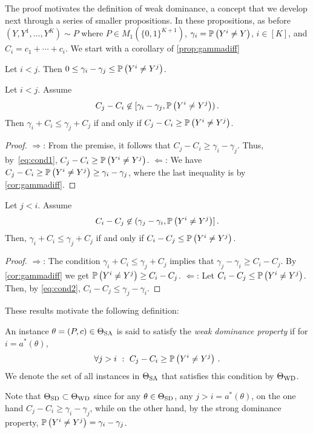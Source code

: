The proof motivates the definition of weak dominance, a concept that we develop next through a series of smaller
propositions. In these propositions, as before $(Y,Y^1,\dots,Y^K) \sim P$ where $P\in M_1(\{0,1\}^{K+1})$,
 $\gamma_i = \mathbb{P}\left(Y^i \ne Y\right)$, $i\in [K]$, and $C_i = c_1 + \cdots + c_i$.
We start with a corollary of \cref{prop:gammadiff}
\begin{cor}
\label{cor:gammadiff}
Let $i<j$. Then $0\le \gamma_i -\gamma_j \le \mathbb{P}\left(Y^i\ne Y^j\right)$.
\end{cor}
\begin{prop}
\label{prop:ilej}
Let $i<j$. Assume 
\begin{align}
\label{eq:cond1}
C_j - C_i \not\in [\gamma_i - \gamma_j, \mathbb{P}\left(Y^i\ne Y^j\right) )\,.
\end{align}
Then $\gamma_i + C_i \le \gamma_j + C_j$ if and only if $C_j - C_i \ge \mathbb{P}\left(Y^i\ne Y^j\right)$.
\end{prop}
\begin{proof}
\noindent $\Rightarrow$: From the premise, it follows that $C_j - C_i \ge \gamma_i - \gamma_j$.
Thus, by~\eqref{eq:cond1}, $C_j - C_i \ge \mathbb{P}\left(Y^i\ne Y^j\right)$.
\noindent $\Leftarrow$: We have $C_j - C_i \ge \mathbb{P}\left(Y^i \ne Y^j\right) \ge \gamma_i -\gamma_j$, where the last
inequality is by \cref{cor:gammadiff}.
\end{proof}
\begin{prop}
\label{prop:jlei}
Let $j<i$. Assume
\begin{align}
\label{eq:cond2}
C_i - C_j \not\in (\gamma_j - \gamma_i, \mathbb{P}\left(Y^i \ne Y^j\right) ]\,.
\end{align}
Then, $\gamma_i + C_i \le \gamma_j + C_j$ if and only if $C_i - C_j \le \mathbb{P}\left(Y^i \ne Y^j\right)$.
\end{prop}
\begin{proof}
\noindent $\Rightarrow$: The condition $\gamma_i + C_i \le \gamma_j + C_j$ implies that $\gamma_j -\gamma_i \ge C_i - C_j$.
By \cref{cor:gammadiff} we get $\mathbb{P}\left(Y^i \ne Y^j\right) \ge C_i - C_j$.
\noindent $\Leftarrow$: Let $C_i - C_j \le \mathbb{P}\left(Y^i \ne Y^j\right)$. Then, by \eqref{eq:cond2}, $C_i - C_j \le \gamma_j - \gamma_i$.
\end{proof}
These results motivate the following definition:
\begin{defi}
	An instance $\theta = (P,c)\in \Theta_{\mathrm{SA}}$  is said to satisfy the \emph{weak dominance property} if 
	for $i = a^*(\theta)$,
	\begin{align}
	\label{eq:wd} \forall j>i\,\,: \,\, C_j - C_i \ge \mathbb{P}\left(Y^i\ne Y^j\right)\,.
	\end{align}
We denote the set of all instances in $\Theta_{\mathrm{SA}}$ that satisfies this condition by $\Theta_{\mathrm{WD}}$.	
\end{defi}
Note that $\Theta_{\mathrm{SD}}\subset \Theta_{\mathrm{WD}}$ since for any $\theta\in \Theta_{\mathrm{SD}}$, any $j>i = a^*(\theta)$, on the one hand $C_j - C_i \ge \gamma_i - \gamma_j$, while on the other hand, by the strong dominance property, $\mathbb{P}\left(Y^i\ne Y^j\right) = \gamma_i - \gamma_j$.

